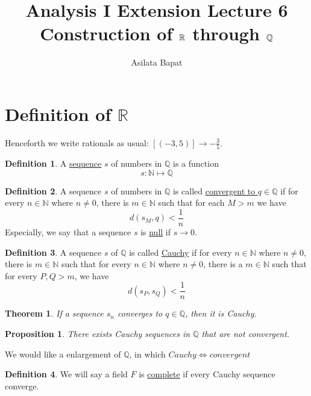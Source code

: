 \documentclass[12pt]{amsart}
\title{Analysis I Extension Lecture 6\\Construction of $\bbR$ through $\bbQ$}
\author{Asilata Bapat}
\newcommand{\bbR}{\mathbb{R}}
\newcommand{\bbN}{\mathbb{N}}
\newcommand{\bbQ}{\mathbb{Q}}
\theoremstyle{plain}
\newtheorem*{prop}{Proposition}
\newtheorem*{thm}{Theorem}
\theoremstyle{remark}
\theoremstyle{definition}
\newtheorem*{define}{Definition}
\begin{document}
\maketitle
{}
\section*{\bf Definition of $\bbR$}
Henceforth we write rationals as usual: $[(-3,5)] \rightarrow -\displaystyle \frac{3}{5}$.
\begin{define}
	A \ul{sequence} $s$ of numbers in $\bbQ$ is a function
	\begin{equation*}
		s: \bbN  \mapsto \bbQ
	\end{equation*}
\end{define}

\begin{define}
	A sequence $s$ of numbers in $\bbQ$ is called \ul{convergent to $q\in \bbQ$} if for every $n \in \bbN$ where $n \neq 0$, there is $m\in \bbN$ such that for each $M > m$ we have 
	\begin{equation*}
		d(s_M, q) < \frac{1}{n}
	\end{equation*}
	Especially, we say that a sequence $s$ is \ul{null} if $s \rightarrow 0$.
\end{define}

\begin{define}
	A sequence $s$ of $\bbQ$ is called \ul{Cauchy} if for every $n \in \bbN$ where $n \neq 0$, there is $m \in \bbN$ such that for every $n \in \bbN$ where $n \neq 0$, there is a $m \in \bbN$ such that for every $P,Q > m$, we have 
	\begin{equation*}
		d(s_P, s_Q) < \frac{1}{n}
	\end{equation*}
\end{define}

\begin{thm}
	If a sequence $s_n$ converges to $q\in \bbQ$, then  it is Cauchy.
\end{thm}

\begin{prop}
	There exists Cauchy sequences in $\bbQ$ that are not convergent.
\end{prop}

\par
We would like a enlargement of $\bbQ$, in which $Cauchy \iff convergent$
\begin{define}
	We will say a field $F$ is \ul{complete} if every Cauchy sequence converge.
\end{define}
\end{document}
